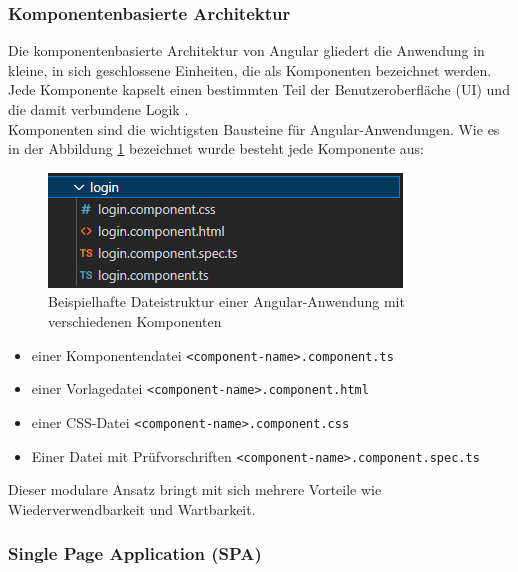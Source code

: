 \subsubsection{Komponentenbasierte Architektur}

Die komponentenbasierte Architektur von Angular gliedert die Anwendung in kleine, in sich geschlossene Einheiten, die als Komponenten bezeichnet werden. Jede Komponente kapselt einen bestimmten Teil der Benutzeroberfläche (UI) und die damit verbundene Logik \cite{Angular2:2024}.\\
Komponenten sind die wichtigsten Bausteine für Angular-Anwendungen. Wie es in der Abbildung \ref{a1} bezeichnet wurde besteht jede Komponente aus: 

\begin{figure} [h]
	\centering
	\includegraphics[scale=1]{images/Components.png}
	\caption{Beispielhafte Dateistruktur einer Angular-Anwendung mit verschiedenen Komponenten}
	\label{a1}
\end{figure}

\begin{itemize}
	\item einer Komponentendatei \texttt{<component-name>.component.ts}
	\item einer Vorlagedatei \texttt{<component-name>.component.html}
	\item einer CSS-Datei \texttt{<component-name>.component.css}
	\item Einer Datei mit Prüfvorschriften \texttt{<component-name>.component.spec.ts}
\end{itemize}

Dieser modulare Ansatz bringt mit sich mehrere Vorteile wie Wiederverwendbarkeit und Wartbarkeit.

\subsubsection{Single Page Application (SPA)}

